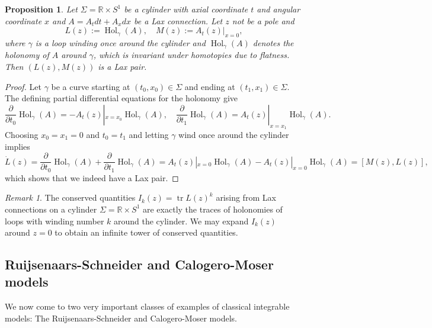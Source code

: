 \documentclass[11pt]{report}
\newtheorem{prop}[theorem]{Proposition}
\theoremstyle{definition}
\theoremstyle{remark}
\newtheorem*{remark}{Remark}
\theoremstyle{remark}
\newcommand{\R}{\mathbb{R}}
\begin{document}
\begin{prop}
Let $\Sigma = \R \times S^1$ be a cylinder with axial coordinate $t$ and angular coordinate $x$ and $A = A_t dt + A_x dx$ be a Lax connection. Let $z$ not be a pole and
\begin{equation*}
L(z) := \operatorname{Hol}_\gamma(A), \quad M(z) := A_t(z)|_{x=0},
\end{equation*}
where $\gamma$ is a loop winding once around the cylinder and $\operatorname{Hol}_{\gamma}(A)$ denotes the holonomy of $A$ around $\gamma$, which is invariant under homotopies due to flatness. Then $(L(z),M(z))$ is a Lax pair.
\end{prop}

\begin{proof}
Let $\gamma$ be a curve starting at $(t_0,x_0) \in \Sigma$ and ending at $(t_1,x_1) \in \Sigma$. The defining partial differential equations for the holonomy give
\begin{equation*}
\frac{\partial}{\partial t_0} \operatorname{Hol}_\gamma(A) = -A_t(z)|_{x=x_0} \operatorname{Hol}_\gamma(A), \quad \frac{\partial}{\partial t_1} \operatorname{Hol}_\gamma(A) = A_t(z)|_{x=x_1} \operatorname{Hol}_\gamma(A).
\end{equation*}
Choosing $x_0 = x_1 = 0$ and $t_0 = t_1$ and letting $\gamma$ wind once around the cylinder implies
\begin{equation*}
\dot L(z) = \frac{\partial}{\partial t_0} \operatorname{Hol}_\gamma(A) + \frac{\partial}{\partial t_1} \operatorname{Hol}_\gamma(A) = A_t(z)|_{x=0} \operatorname{Hol}_\gamma(A) - A_t(z)|_{x=0} \operatorname{Hol}_\gamma(A) = [M(z),L(z)],
\end{equation*}
which shows that we indeed have a Lax pair.
\end{proof}

\begin{remark}
The conserved quantities $I_k(z) = \operatorname{tr} L(z)^k$ arising from Lax connections on a cylinder $\Sigma = \R \times S^1$ are exactly the traces of holonomies of loops with winding number $k$ around the cylinder. We may expand $I_k(z)$ around $z=0$ to obtain an infinite tower of conserved quantities.
\end{remark}

\subsection{Ruijsenaars-Schneider and Calogero-Moser models}

We now come to two very important classes of examples of classical integrable models: The Ruijsenaars-Schneider and Calogero-Moser models.
\end{document}
